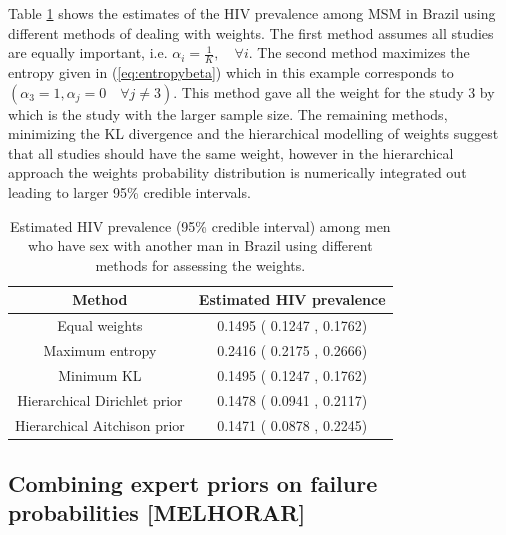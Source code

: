 \documentclass[a4paper, notitlepage, 10pt]{article}
\begin{document}
Table \ref{tab:probMeta} shows the estimates of the HIV prevalence among MSM in Brazil using different methods of dealing with weights. 
The first method assumes all studies are equally important, i.e. $\alpha_i = \frac{1}{K}, \quad \forall i$. The second method maximizes the entropy given in (\ref{eq:entropybeta}) which in this example corresponds to $(\alpha_3 = 1, \alpha_j = 0 \quad \forall j \neq 3)$. 
This method gave all the weight for the study 3 by \cite{sutmoller2002human} which is the study with the larger sample size. 
The remaining methods, minimizing the KL divergence and the hierarchical modelling of weights suggest that all studies should have the same weight, however in the hierarchical approach the weights probability distribution is numerically integrated out leading to larger 95\% credible intervals. 
\begin{table}[ht]
\caption{Estimated HIV prevalence (95\% credible interval) among men who have sex with another man in Brazil using different methods for assessing the weights.}
\centering
\label{tab:probMeta}
\begin{tabular}{cc}
 \hline
Method & Estimated HIV prevalence \\ 
 \hline
 Equal weights                & 0.1495   (   0.1247  ,    0.1762) \\ 
 Maximum entropy              & 0.2416   (   0.2175  ,    0.2666) \\ 
 Minimum KL                   & 0.1495   (   0.1247  ,    0.1762) \\ 
 Hierarchical Dirichlet prior & 0.1478   (   0.0941  ,    0.2117) \\ 
 Hierarchical Aitchison prior & 0.1471   (   0.0878  ,    0.2245) \\ 
  \hline
\end{tabular}
\end{table}




\subsection*{Combining expert priors on failure probabilities [MELHORAR]}
\label{sec:beta}
\end{document}
